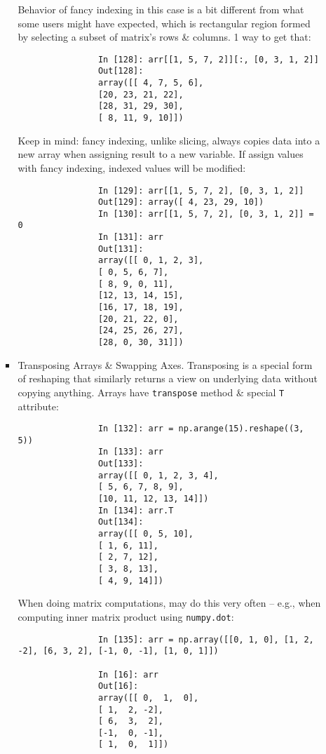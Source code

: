 \documentclass{article}
\begin{document}
\begin{itemize}
\begin{itemize}
\begin{itemize}
			Behavior of fancy indexing in this case is a bit different from what some users might have expected, which is rectangular region formed by selecting a subset of matrix's rows \& columns. 1 way to get that:
			\begin{verbatim}
				In [128]: arr[[1, 5, 7, 2]][:, [0, 3, 1, 2]]
				Out[128]:
				array([[ 4, 7, 5, 6],
				[20, 23, 21, 22],
				[28, 31, 29, 30],
				[ 8, 11, 9, 10]])
			\end{verbatim}
			Keep in mind: fancy indexing, unlike slicing, always copies data into a new array when assigning result to a new variable. If assign values with fancy indexing, indexed values will be modified:
			\begin{verbatim}
				In [129]: arr[[1, 5, 7, 2], [0, 3, 1, 2]]
				Out[129]: array([ 4, 23, 29, 10])
				In [130]: arr[[1, 5, 7, 2], [0, 3, 1, 2]] = 0
				In [131]: arr
				Out[131]:
				array([[ 0, 1, 2, 3],
				[ 0, 5, 6, 7],
				[ 8, 9, 0, 11],
				[12, 13, 14, 15],
				[16, 17, 18, 19],
				[20, 21, 22, 0],
				[24, 25, 26, 27],
				[28, 0, 30, 31]])
			\end{verbatim}
			\item {\sf Transposing Arrays \& Swapping Axes.} Transposing is a special form of reshaping that similarly returns a view on underlying data without copying anything. Arrays have {\tt transpose} method \& special {\tt T} attribute:
			\begin{verbatim}
				In [132]: arr = np.arange(15).reshape((3, 5))
				In [133]: arr
				Out[133]:
				array([[ 0, 1, 2, 3, 4],
				[ 5, 6, 7, 8, 9],
				[10, 11, 12, 13, 14]])
				In [134]: arr.T
				Out[134]:
				array([[ 0, 5, 10],
				[ 1, 6, 11],
				[ 2, 7, 12],
				[ 3, 8, 13],
				[ 4, 9, 14]])
			\end{verbatim}
			When doing matrix computations, may do this very often -- e.g., when computing inner matrix product using {\tt numpy.dot}:
			\begin{verbatim}
				In [135]: arr = np.array([[0, 1, 0], [1, 2, -2], [6, 3, 2], [-1, 0, -1], [1, 0, 1]])
				
				In [16]: arr
				Out[16]: 
				array([[ 0,  1,  0],
				[ 1,  2, -2],
				[ 6,  3,  2],
				[-1,  0, -1],
				[ 1,  0,  1]])
				

\end{verbatim}
\end{itemize}
\end{itemize}
\end{itemize}
\end{document}

